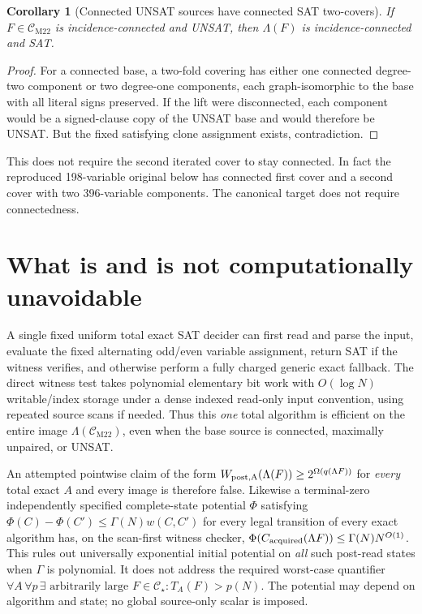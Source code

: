 \documentclass[11pt]{article}
\newtheorem{corollary}[theorem]{Corollary}
\newcommand{\CM}{\mathcal C_{\mathrm{M22}}}
\newcommand{\CS}{\mathcal C_\star}
\begin{document}
\begin{corollary}[Connected UNSAT sources have connected SAT two-covers]
If \(F\in\CM\) is incidence-connected and UNSAT, then
\(\Lambda(F)\) is incidence-connected and SAT.
\end{corollary}
\begin{proof}
For a connected base, a two-fold covering has either one connected
degree-two component or two degree-one components, each graph-isomorphic
to the base with all literal signs preserved.
If the lift were disconnected, each component would be a signed-clause
copy of the UNSAT base and would therefore be UNSAT.
But the fixed satisfying clone assignment exists, contradiction.
\end{proof}
This does not require the second iterated cover to stay connected.
In fact the reproduced 198-variable original below has
connected first cover and a second cover with two 396-variable components.
The canonical target does not require connectedness.

\section{What is and is not computationally unavoidable}
A single fixed uniform total exact SAT decider can first read and parse
the input, evaluate the fixed alternating odd/even variable assignment,
return SAT if the witness verifies, and otherwise perform a fully charged
generic exact fallback.  The direct witness test takes polynomial
elementary bit work with \(O(\log N)\) writable/index storage under a
dense indexed read-only input convention, using repeated source scans if
needed.  Thus this \emph{one} total algorithm is efficient on the entire
image \(\Lambda(\CM)\), even when the base source is connected, maximally
unpaired, or UNSAT.

An attempted pointwise claim of the form
\(W_{\rm post,A}(\Lambda(F))\ge2^{\Omega(q(\Lambda F))}\) for
\emph{every} total exact \(A\) and every image is therefore false.
Likewise a terminal-zero independently specified complete-state
potential \(\Phi\) satisfying
\(\Phi(C)-\Phi(C')\le\Gamma(N)w(C,C')\) for every legal transition
of every exact algorithm has, on the scan-first witness checker,
\(\Phi(C_{\rm acquired}(\Lambda F))\le\Gamma(N)N^{O(1)}\).
This rules out universally exponential initial potential on
\emph{all} such post-read states when \(\Gamma\) is polynomial.
It does not address the required worst-case quantifier
\(\forall A\,\forall p\,\exists\text{ arbitrarily large }F\in\CS:
T_A(F)>p(N)\).  The potential may depend on algorithm and state;
no global source-only scalar is imposed.
\end{document}
